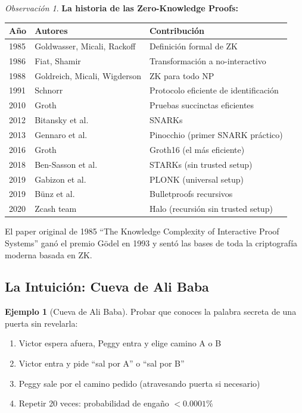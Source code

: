 \documentclass[11pt,a4paper,twoside,openright]{book}
\theoremstyle{definition}
\newtheorem{example}{Ejemplo}[chapter]
\theoremstyle{plain}
\theoremstyle{remark}
\newtheorem{remark}{Observación}[chapter]
\begin{document}
\begin{remark}
\textbf{La historia de las Zero-Knowledge Proofs:}

\begin{center}
\begin{tabular}{lll}
\toprule
\textbf{Año} & \textbf{Autores} & \textbf{Contribución} \\
\midrule
1985 & Goldwasser, Micali, Rackoff & Definición formal de ZK \\
1986 & Fiat, Shamir & Transformación a no-interactivo \\
1988 & Goldreich, Micali, Wigderson & ZK para todo NP \\
1991 & Schnorr & Protocolo eficiente de identificación \\
2010 & Groth & Pruebas succinctas eficientes \\
2012 & Bitansky et al. & SNARKs \\
2013 & Gennaro et al. & Pinocchio (primer SNARK práctico) \\
2016 & Groth & Groth16 (el más eficiente) \\
2018 & Ben-Sasson et al. & STARKs (sin trusted setup) \\
2019 & Gabizon et al. & PLONK (universal setup) \\
2019 & Bünz et al. & Bulletproofs recursivos \\
2020 & Zcash team & Halo (recursión sin trusted setup) \\
\bottomrule
\end{tabular}
\end{center}

El paper original de 1985 ``The Knowledge Complexity of Interactive Proof Systems'' ganó el premio Gödel en 1993 y sentó las bases de toda la criptografía moderna basada en ZK.
\end{remark}

\subsection{La Intuición: Cueva de Ali Baba}

\begin{example}[Cueva de Ali Baba]
Probar que conoces la palabra secreta de una puerta sin revelarla:
\begin{enumerate}
    \item Victor espera afuera, Peggy entra y elige camino A o B
    \item Victor entra y pide ``sal por A'' o ``sal por B''
    \item Peggy sale por el camino pedido (atravesando puerta si necesario)
    \item Repetir 20 veces: probabilidad de engaño $< 0.0001\%$
\end{enumerate}
\end{example}
\end{document}
